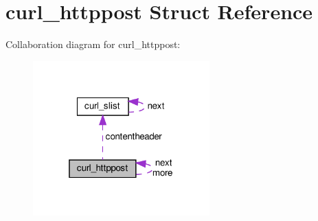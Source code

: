 \hypertarget{structcurl__httppost}{}\section{curl\+\_\+httppost Struct Reference}
\label{structcurl__httppost}


Collaboration diagram for curl\+\_\+httppost\+:
\nopagebreak
\begin{figure}[H]
\begin{center}
\leavevmode
\includegraphics[width=193pt]{structcurl__httppost__coll__graph}
\end{center}
\end{figure}
